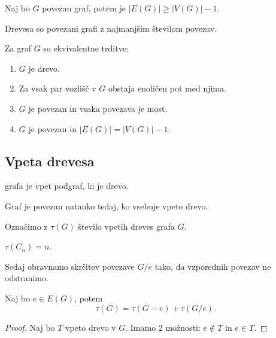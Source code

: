 \begin{lema}
    Naj bo $G$ povezan graf, potem je $|E(G)| \geq |V(G)| -1$.
\end{lema}

\begin{opomba}
    Drevesa so povezani grafi z najmanjšim številom povezav.
\end{opomba}

\begin{izrek}
    Za graf $G$ so ekvivalentne trditve:
    \begin{enumerate}
        \item $G$ je drevo.
        \item Za vsak par vozlišč v $G$ obstaja enoličen pot med njima.
        \item $G$ je povezan in vsaka povezava je most.
        \item $G$ je povezan in $|E(G)| = |V(G)|-1$.
    \end{enumerate}
\end{izrek}

\subsection{Vpeta drevesa}
\begin{definicija}
     grafa je vpet podgraf, ki je drevo.
\end{definicija}

\begin{trditev}
    Graf je povezan natanko tedaj, ko vsebuje vpeto drevo.
\end{trditev}

Označimo z $\tau(G)$ število vpetih dreves grafa $G$.
\begin{primer}
    $\tau(C_n) = n$.
\end{primer}

\begin{opomba}
    Sedaj obravnamo skrčitev povezave $G/e$ tako, da vzporednih povezav ne odstranimo.
\end{opomba}

\begin{trditev}
    Naj bo $e \in E(G)$, potem $$\tau(G) = \tau(G-e) + \tau (G/e).$$
\end{trditev}

\begin{proof}
    Naj bo $T$ vpeto drevo v $G$. Imamo 2 možnosti: $e \notin T$ in $e \in T$.
\end{proof}

